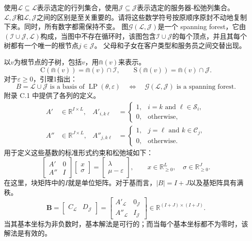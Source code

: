 \documentclass{article}
\begin{document}
使用$\mathscr L\subseteq\mathcal L$表示选定的行列集合，使用$\mathscr J\subseteq\mathcal J$表示选定的服务器-松弛列集合。 $\mathscr L,\mathscr J$和$\mathcal L,\mathcal J$之间的区别是至关重要的。请将这些数学符号按原顺序原封不动地复制下来。同时，所有数字都需保持不变。 图$\mathcal G(\mathscr L,\mathscr J)$是一个 spanning forest，它由$(\mathcal I\cup\mathcal J,\mathcal L)$构成，当图中不存在循环时，该图包含$\mathcal I\cup\mathcal J$的每个顶点，并且其每个树都有一个唯一的根节点$j\in\mathscr J$。 父母和子女在客户类型和服务员之间交替出现。

以$v$为根节点的子树，包括$v$，用$\Cap(v)$来表示。
\[
\mathrm C(\Cap(v))=\Cap(v)\cap\mathcal I,\qquad
\mathrm S(\Cap(v))=\Cap(v)\cap\mathcal J.
\]
对于$\varepsilon\geq0$，引理1指出：
\[
B=\mathscr L\cup\mathscr J\text{ is a basis of }\operatorname{LP}(\theta,\varepsilon)
\quad\Longleftrightarrow\quad
\mathcal G(\mathscr L,\mathscr J)\text{ is a spanning forest}.
\]
附录 C.1 中提供了各列的定义。
\begin{align}
A'&\in\mathbb R^{I\times L},&
A'_{i,k\ell}&=\begin{cases}1,&i=k\text{ and }\ell\in\mathcal S_i,\\0,&\text{otherwise},\end{cases}\tag{112}\\
A''&\in\mathbb R^{J\times L},&
A''_{j,k\ell}&=\begin{cases}1,&j=\ell\text{ and }k\in\mathcal C_j,\\0,&\text{otherwise}.\end{cases}\tag{113}
\end{align}
用于定义这些基数的标准形式约束和松弛域如下：
\begin{equation}
\begin{bmatrix}A'&0\\A''&I\end{bmatrix}
\begin{bmatrix}x\\\sigma\end{bmatrix}
=\begin{bmatrix}\lambda\\\mu-\varepsilon\end{bmatrix},
\qquad x\in\mathbb R_{\geq0}^{L},\quad\sigma\in\mathbb R_{\geq0}^{J}.
\tag{111b}
\end{equation}
在这里，块矩阵中的$I$就是单位矩阵。对于基而言，$|B|=I+J$以及基矩阵具有满秩。
\begin{equation}
\mathbf B=
\begin{bmatrix}C_{\mathscr L}&D_{\mathscr J}\end{bmatrix}
=\begin{bmatrix}A'_{\mathscr L}&0_{\mathscr J}\\
A''_{\mathscr L}&I_{\mathscr J}\end{bmatrix}
\in\mathbb R^{(I+J)\times(I+J)}.
\tag{114}
\end{equation}
当其基本坐标为非负数时，基本解法是可行的；而当每个基本坐标都不为零时，该解法是有效的。
\end{document}
